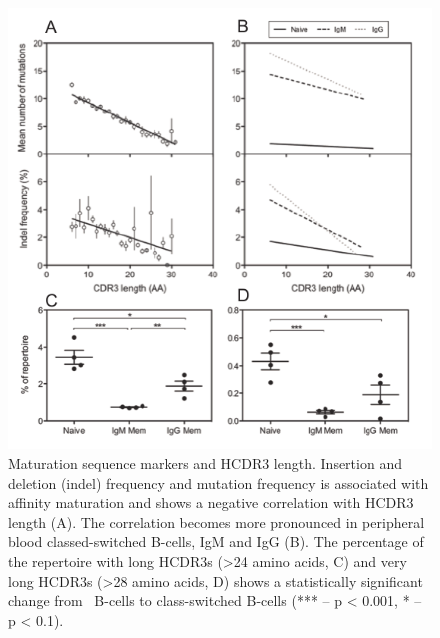 \begin{figure}[!t]
   \centering
   \includegraphics{images/chapter3/figure3_4.pdf} %
   \caption[Maturation Sequence Markers and HCDR3 Length]{Maturation sequence markers and HCDR3 length. Insertion and deletion (indel) frequency and mutation frequency is associated with affinity maturation and shows a negative correlation with HCDR3 length (A). The correlation becomes more pronounced in peripheral blood classed-switched B-cells, IgM and IgG (B). The percentage of the repertoire with long HCDR3s (>24 amino acids, C) and very long HCDR3s (>28 amino acids, D) shows a statistically significant change from \naive~B-cells to class-switched B-cells (*** -- p < 0.001, * -- p < 0.1).}
   \label{fig:figure3_4}
\end{figure}

